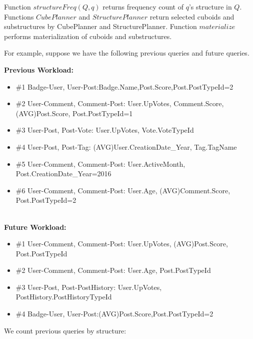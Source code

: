Function $structureFreq(Q, q)$ returns frequency count of $q$'s structure in $Q$. Functions $CubePlanner$ and $StructurePlanner$  return selected cuboids and substructures by CubePlanner and StructurePlanner. Function $materialize$ performs materialization of cuboids and substructures.

For example, suppose we have the following previous queries and future queries.

\textbf{Previous Workload:}

\begin{itemize}
\item \#1 Badge-User, User-Post:Badge.Name,Post.Score,Post.PostTypeId=2

\item \#2 User-Comment, Comment-Post: User.UpVotes, Comment.Score, (AVG)Post.Score, Post.PostTypeId=1

\item \#3 User-Post, Post-Vote: User.UpVotes, Vote.VoteTypeId

\item \#4 User-Post, Post-Tag: (AVG)User.CreationDate\_Year, Tag.TagName

\item \#5 User-Comment, Comment-Post: User.ActiveMonth, Post.CreationDate\_Year=2016

\item \#6 User-Comment, Comment-Post: User.Age, (AVG)Comment.Score, Post.PostTypeId=2
\end{itemize}


\\
\textbf{Future Workload:}

\begin{itemize}
\item \#1 User-Comment, Comment-Post: User.UpVotes, (AVG)Post.Score, Post.PostTypeId

\item \#2 User-Comment, Comment-Post: User.Age, Post.PostTypeId

\item \#3 User-Post, Post-PostHistory: User.UpVotes, PostHistory.PostHistoryTypeId

\item \#4 Badge-User, User-Post:(AVG)Post.Score,Post.PostTypeId=2
\end{itemize}

\par
We count previous queries by structure:

